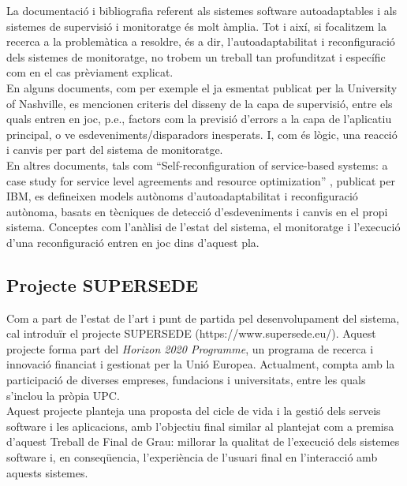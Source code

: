 La documentació i bibliografia referent als sistemes software autoadaptables i als sistemes de supervisió i monitoratge és molt àmplia. Tot i així, si focalitzem la recerca a la problemàtica a resoldre, és a dir, l’autoadaptabilitat i reconfiguració dels sistemes de monitoratge, no trobem un treball tan profunditzat i específic com en el cas prèviament explicat.\\

En alguns documents, com per exemple el ja esmentat publicat per la University of Nashville, es mencionen criteris del disseny de la capa de supervisió, entre els quals entren en joc, p.e., factors com la previsió d’errors a la capa de l’aplicatiu principal, o ve esdeveniments/disparadors inesperats. I, com és lògic, una reacció i canvis per part del sistema de monitoratge. \\

En altres documents, tals com “Self-reconfiguration of service-based systems: a case study for service level agreements and resource optimization” , publicat per IBM, es defineixen models autònoms d’autoadaptabilitat i reconfiguració autònoma, basats en tècniques de detecció d’esdeveniments i canvis en el propi sistema. Conceptes com l’anàlisi de l’estat del sistema, el monitoratge i l’execució d’una reconfiguració entren en joc dins d’aquest pla.


\subsection{Projecte SUPERSEDE}

Com a part de l'estat de l'art i punt de partida pel desenvolupament del sistema, cal introduïr el projecte SUPERSEDE (https://www.supersede.eu/). Aquest projecte forma part del \textit{Horizon 2020 Programme}, un programa de recerca i innovació financiat i gestionat per la Unió Europea. Actualment, compta amb la participació de diverses empreses, fundacions i universitats, entre les quals s'inclou la pròpia UPC. \\

Aquest projecte planteja una proposta del cicle de vida i la gestió dels serveis software i les aplicacions, amb l'objectiu final similar al plantejat com a premisa d'aquest Treball de Final de Grau: millorar la qualitat de l'execució dels sistemes software i, en conseqüencia, l'experiència de l'usuari final en l'interacció amb aquests sistemes. \\

